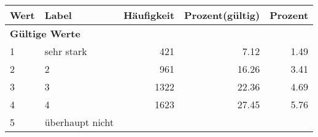      \begin{longtable}{lXrrr}
     \toprule
     \textbf{Wert} & \textbf{Label} & \textbf{Häufigkeit} & \textbf{Prozent(gültig)} & \textbf{Prozent} \\
     \endhead
     \midrule
     \multicolumn{5}{l}{\textbf{Gültige Werte}}\\

     1 &
     \multicolumn{1}{X}{ sehr stark   } &


       \num{421} &
       \num[round-mode=places,round-precision=2]{7,12} &
         \num[round-mode=places,round-precision=2]{1,49} \\

     2 &
     \multicolumn{1}{X}{ 2   } &


       \num{961} &
       \num[round-mode=places,round-precision=2]{16,26} &
         \num[round-mode=places,round-precision=2]{3,41} \\

     3 &
     \multicolumn{1}{X}{ 3   } &


       \num{1322} &
       \num[round-mode=places,round-precision=2]{22,36} &
         \num[round-mode=places,round-precision=2]{4,69} \\

     4 &
     \multicolumn{1}{X}{ 4   } &


       \num{1623} &
       \num[round-mode=places,round-precision=2]{27,45} &
         \num[round-mode=places,round-precision=2]{5,76} \\

     5 &
     \multicolumn{1}{X}{ überhaupt nicht   } &



\end{longtable}
